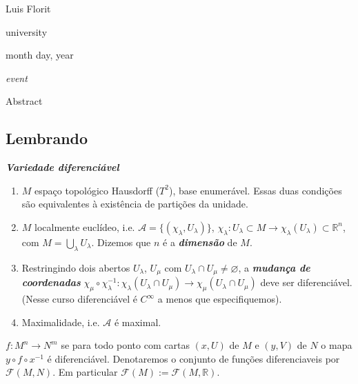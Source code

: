 \hfill{\Large Luis Florit}

{\Large \hfill university}

\hfill{\large month day, year

\hfill \textit{event}}
\vspace{2em}

\begin{thing6}{Abstract}

\end{thing6}
\vspace{2em}
\subsection{Lembrando}

\begin{defn}\leavevmode
\textit{\textbf{Variedade diferenciável}}
\begin{enumerate}
\item \(M\) espaço topológico Hausdorff (\(T^2\)), base enumerável. Essas duas condições são equivalentes à existência de partições da unidade.

\item \(M\) localmente euclídeo, i.e. \(\mathcal{A}=\{(\chi_\lambda,U_\lambda)\}\), \(\chi_\lambda:U_\lambda \subset M \to\chi_\lambda(U_\lambda)\subset \mathbb{R}^n\), com \(M=\bigcup_{\lambda}U_\lambda\). Dizemos que \(n\) é a \textit{\textbf{dimensão}} de \(M\).

\item Restringindo dois abertos \(U_\lambda\), \(U_\mu\) com \(U_\lambda \cap U_\mu \neq  \varnothing\), a \textit{\textbf{mudança de coordenadas}} \(\chi_\mu \circ \chi_\lambda^{-1}:\chi_\lambda(U_\lambda \cap U_\mu) \to \chi_\mu(U_\lambda \cap U_\mu)\) deve ser diferenciável. (Nesse curso diferenciável é \(C^\infty\) a menos que especifiquemos).

\item Maximalidade, i.e. \(\mathcal{A}\) é maximal.
\end{enumerate}
\end{defn}

\begin{defn}\leavevmode
\(f:M^n \to N^m\) se para todo ponto com cartas \((x,U)\) de  \(M\) e \((y,V)\) de \(N\) o mapa \(y \circ f \circ x^{-1}\) é diferenciável. Denotaremos o conjunto de funções diferenciaveis por \(\mathcal{F}(M,N)\). Em particular \(\mathcal{F}(M):=\mathcal{F}(M,\mathbb{R})\).

\end{defn}

